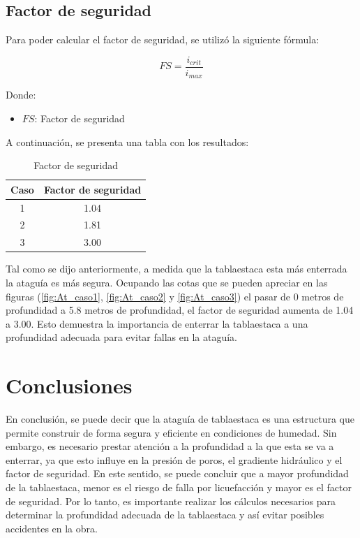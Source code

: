 \documentclass{article}
\begin{document}
\newpage
\subsection{Factor de seguridad}
Para poder calcular el factor de seguridad, se utilizó la siguiente fórmula:

\begin{equation}
  FS = \frac{i_{crit}}{i_{max}}
\end{equation}

Donde:
\begin{itemize}
    \item $FS$: Factor de seguridad
\end{itemize}

A continuación, se presenta una tabla con los resultados:

\begin{table}[h!]
  \centering
  \begin{tabular}{cc}
    \hline
    \textbf{Caso} & \textbf{Factor de seguridad} \\
    \hline
    1 &1.04 \\
    2 &1.81 \\
    3 &3.00 \\
    \hline
  \end{tabular}
  \caption{Factor de seguridad}
  \label{tab:seguridad}
\end{table}

Tal como se dijo anteriormente, a medida que la tablaestaca esta más enterrada la ataguía es más segura. Ocupando las cotas que se pueden apreciar en las figuras (\ref{fig:At_caso1}, \ref{fig:At_caso2} y \ref{fig:At_caso3}) el pasar de 0 metros de profundidad a 5.8 metros de profundidad, el factor de seguridad aumenta de 1.04 a 3.00. Esto demuestra la importancia de enterrar la tablaestaca a una profundidad adecuada para evitar fallas en la ataguía. 

\newpage

\section{Conclusiones}

En conclusión, se puede decir que la ataguía de tablaestaca es una estructura que permite construir de forma segura y eficiente en condiciones de humedad. Sin embargo, es necesario prestar atención a la profundidad a la que esta se va a enterrar, ya que esto influye en la presión de poros, el gradiente hidráulico y el factor de seguridad. En este sentido, se puede concluir que a mayor profundidad de la tablaestaca, menor es el riesgo de falla por licuefacción y mayor es el factor de seguridad. Por lo tanto, es importante realizar los cálculos necesarios para determinar la profundidad adecuada de la tablaestaca y así evitar posibles accidentes en la obra.\\
\end{document}
